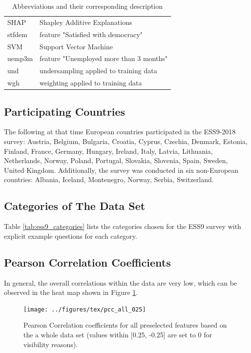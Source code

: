 \documentclass[10pt]{article}
\begin{document}
\begin{table}[h!]
\begin{tabular}{@{}ll@{}}
			SHAP 		& Shapley Additive Explanations		\\
			stfdem       & feature "Satisfied with democracy"                             \\ 
			SVM			& Support Vector Machine		\\ 
			uemp3m       & feature "Unemployed more than 3 months"      \\ 
			und          & undersampling applied to training data                                 \\ 
			wgh          & weighting applied to training data                                         \\ \bottomrule
		\end{tabular}
		\caption{Abbreviations and their corresponding description}
		\label{tab:abbreviations}
	\end{table}
	
	
	\subsection{Participating Countries} \label{sec:participating_countries}
	The following at that time European countries participated in the ESS9-2018 survey: Austria, Belgium, Bulgaria, Croatia, Cyprus, Czechia, Denmark, Estonia, Finland, France, Germany, Hungary, Ireland, Italy, Latvia, Lithuania, Netherlands, Norway, Poland, Portugal, Slovakia, Slovenia, Spain, Sweden, United Kingdom. Additionally, the survey was conducted in six non-European countries: Albania, Iceland, Montenegro, Norway, Serbia, Switzerland.
	\subsection{Categories of The Data Set}
	Table \ref{tab:ess9_categories} lists the categories chosen for the ESS9 survey with explicit example questions for each category.
	
	\subsection{Pearson Correlation Coefficients} \label{sec:pcc}
	
	In general, the overall correlations within the data are very low, which can be observed in the heat map shown in Figure \ref{fig:pcc_all}. 
	
	\begin{figure}[h]
		\centering
		\texttt{[image: ../figures/tex/pcc\_all\_025]}
		\caption{Pearson Correlation coefficients for all preselected features based on the a whole data set (values within [0.25, -0.25] are set to 0 for visibility reasons).}
		\label{fig:pcc_all}
	\end{figure}
	
\end{document}
